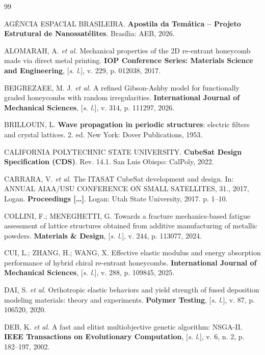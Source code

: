 \begin{thebibliography}{99}
\setlength{\itemsep}{\onelineskip}
\SingleSpacing
\raggedright

AGÊNCIA ESPACIAL BRASILEIRA. \textbf{Apostila da Temática -- Projeto Estrutural de Nanossatélites}. Brasília: AEB, 2026.

ALOMARAH, A. \textit{et al.} Mechanical properties of the 2D re-entrant honeycomb made via direct metal printing. \textbf{IOP Conference Series: Materials Science and Engineering}, [\textit{s. l.}], v. 229, p. 012038, 2017.

BEIGREZAEE, M. J. \textit{et al.} A refined Gibson-Ashby model for functionally graded honeycombs with random irregularities. \textbf{International Journal of Mechanical Sciences}, [\textit{s. l.}], v. 314, p. 111297, 2026.

BRILLOUIN, L. \textbf{Wave propagation in periodic structures}: electric filters and crystal lattices. 2. ed. New York: Dover Publications, 1953.

CALIFORNIA POLYTECHNIC STATE UNIVERSITY. \textbf{CubeSat Design Specification (CDS)}. Rev. 14.1. San Luis Obispo: CalPoly, 2022.

CARRARA, V. \textit{et al.} The ITASAT CubeSat development and design. In: ANNUAL AIAA/USU CONFERENCE ON SMALL SATELLITES, 31., 2017, Logan. \textbf{Proceedings [\ldots]}. Logan: Utah State University, 2017. p. 1--10.

COLLINI, F.; MENEGHETTI, G. Towards a fracture mechanics-based fatigue assessment of lattice structures obtained from additive manufacturing of metallic powders. \textbf{Materials \& Design}, [\textit{s. l.}], v. 244, p. 113077, 2024.

CUI, L.; ZHANG, H.; WANG, X. Effective elastic modulus and energy absorption performance of hybrid chiral re-entrant honeycombs. \textbf{International Journal of Mechanical Sciences}, [\textit{s. l.}], v. 288, p. 109845, 2025.

DAI, S. \textit{et al.} Orthotropic elastic behaviors and yield strength of fused deposition modeling materials: theory and experiments. \textbf{Polymer Testing}, [\textit{s. l.}], v. 87, p. 106520, 2020.

DEB, K. \textit{et al.} A fast and elitist multiobjective genetic algorithm: NSGA-II. \textbf{IEEE Transactions on Evolutionary Computation}, [\textit{s. l.}], v. 6, n. 2, p. 182--197, 2002.


\end{thebibliography}
